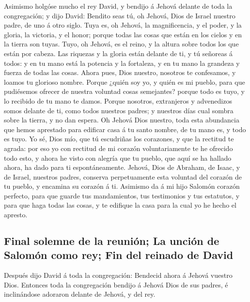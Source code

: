  Asimismo holgóse mucho el rey David, y bendijo á Jehová
delante de toda la congregación; y dijo David: Bendito seas tú, oh
Jehová, Dios de Israel nuestro padre, de uno á otro siglo.
 Tuya es, oh Jehová, la magnificencia, y el poder, y la
gloria, la victoria, y el honor; porque todas las cosas que están en los
cielos y en la tierra son tuyas. Tuyo, oh Jehová, es el reino, y la
altura sobre todos los que están por cabeza.  Las
riquezas y la gloria están delante de ti, y tú señoreas á todos: y en tu
mano está la potencia y la fortaleza, y en tu mano la grandeza y fuerza
de todas las cosas.  Ahora pues, Dios nuestro, nosotros
te confesamos, y loamos tu glorioso nombre.  Porque
¿quién soy yo, y quién es mi pueblo, para que pudiésemos ofrecer de
nuestra voluntad cosas semejantes? porque todo es tuyo, y lo recibido de
tu mano te damos.  Porque nosotros, extranjeros y
advenedizos somos delante de ti, como todos nuestros padres; y nuestros
días cual sombra sobre la tierra, y no dan espera.  Oh
Jehová Dios nuestro, toda esta abundancia que hemos aprestado para
edificar casa á tu santo nombre, de tu mano es, y todo es tuyo.
 Yo sé, Dios mío, que tú escudriñas los corazones, y que
la rectitud te agrada: por eso yo con rectitud de mi corazón
voluntariamente te he ofrecido todo esto, y ahora he visto con alegría
que tu pueblo, que aquí se ha hallado ahora, ha dado para ti
espontáneamente.  Jehová, Dios de Abraham, de Isaac, y de
Israel, nuestros padres, conserva perpetuamente esta voluntad del
corazón de tu pueblo, y encamina su corazón á ti. 
Asimismo da á mi hijo Salomón corazón perfecto, para que guarde tus
mandamientos, tus testimonios y tus estatutos, y para que haga todas las
cosas, y te edifique la casa para la cual yo he hecho el apresto.

\hypertarget{final-solemne-de-la-reuniuxf3n-la-unciuxf3n-de-salomuxf3n-como-rey-fin-del-reinado-de-david}{%
\subsection{Final solemne de la reunión; La unción de Salomón como rey;
Fin del reinado de
David}\label{final-solemne-de-la-reuniuxf3n-la-unciuxf3n-de-salomuxf3n-como-rey-fin-del-reinado-de-david}}

 Después dijo David á toda la congregación: Bendecid
ahora á Jehová vuestro Dios. Entonces toda la congregación bendijo á
Jehová Dios de sus padres, é inclinándose adoraron delante de Jehová, y
del rey.

